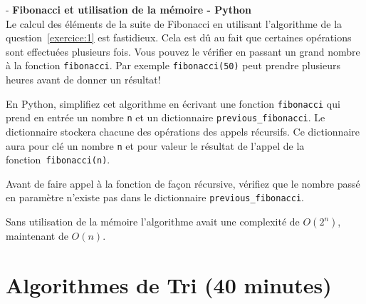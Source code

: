 \begin{Exercice}[15 minutes] - \textbf{Fibonacci et utilisation de la mémoire - Python}\\

Le calcul des éléments de la suite de Fibonacci en utilisant l'algorithme de la question~\ref{exercice:1} est fastidieux. Cela est dû au fait que certaines opérations sont effectuées plusieurs fois. Vous pouvez le vérifier en passant un grand nombre à la fonction \lstinline{fibonacci}. Par exemple \lstinline{fibonacci(50)} peut prendre plusieurs heures avant de donner un résultat!

En Python, simplifiez cet algorithme en écrivant une fonction \lstinline{fibonacci} qui prend en entrée un nombre \lstinline{n} et un dictionnaire \lstinline{previous_fibonacci}. Le dictionnaire stockera chacune des opérations des appels récursifs. Ce dictionnaire aura pour clé un nombre \lstinline{n} et pour valeur le résultat de l'appel de la fonction~\lstinline{fibonacci(n)}. 

Avant de faire appel à la fonction de façon récursive, vérifiez que le nombre passé en paramètre n'existe pas dans le dictionnaire \lstinline{previous_fibonacci}.


\begin{solution}
    Sans utilisation de la mémoire l'algorithme avait une complexité de $O(2^n)$, maintenant de $O(n)$.
     
\end{solution}

\end{Exercice}

\section{Algorithmes de Tri (40 minutes)}

